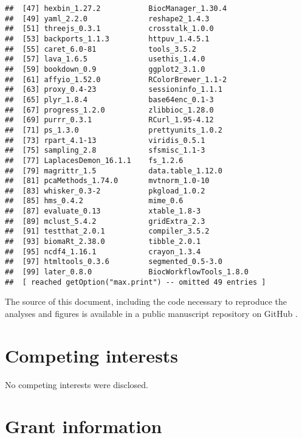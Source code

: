 \documentclass[9pt,a4paper,]{extarticle}
\begin{document}
\begin{verbatim}
##  [47] hexbin_1.27.2           BiocManager_1.30.4     
##  [49] yaml_2.2.0              reshape2_1.4.3         
##  [51] threejs_0.3.1           crosstalk_1.0.0        
##  [53] backports_1.1.3         httpuv_1.4.5.1         
##  [55] caret_6.0-81            tools_3.5.2            
##  [57] lava_1.6.5              usethis_1.4.0          
##  [59] bookdown_0.9            ggplot2_3.1.0          
##  [61] affyio_1.52.0           RColorBrewer_1.1-2     
##  [63] proxy_0.4-23            sessioninfo_1.1.1      
##  [65] plyr_1.8.4              base64enc_0.1-3        
##  [67] progress_1.2.0          zlibbioc_1.28.0        
##  [69] purrr_0.3.1             RCurl_1.95-4.12        
##  [71] ps_1.3.0                prettyunits_1.0.2      
##  [73] rpart_4.1-13            viridis_0.5.1          
##  [75] sampling_2.8            sfsmisc_1.1-3          
##  [77] LaplacesDemon_16.1.1    fs_1.2.6               
##  [79] magrittr_1.5            data.table_1.12.0      
##  [81] pcaMethods_1.74.0       mvtnorm_1.0-10         
##  [83] whisker_0.3-2           pkgload_1.0.2          
##  [85] hms_0.4.2               mime_0.6               
##  [87] evaluate_0.13           xtable_1.8-3           
##  [89] mclust_5.4.2            gridExtra_2.3          
##  [91] testthat_2.0.1          compiler_3.5.2         
##  [93] biomaRt_2.38.0          tibble_2.0.1           
##  [95] ncdf4_1.16.1            crayon_1.3.4           
##  [97] htmltools_0.3.6         segmented_0.5-3.0      
##  [99] later_0.8.0             BiocWorkflowTools_1.8.0
##  [ reached getOption("max.print") -- omitted 49 entries ]
\end{verbatim}

The source of this document, including the code necessary to reproduce
the analyses and figures is available in a public manuscript
repository on GitHub \citep{ghrepo}.

\hypertarget{competing-interests}{%
\section{Competing interests}\label{competing-interests}}

No competing interests were disclosed.

\hypertarget{grant-information}{%
\section{Grant information}\label{grant-information}}

\renewcommand\refname{References}
{\small}
\end{document}
